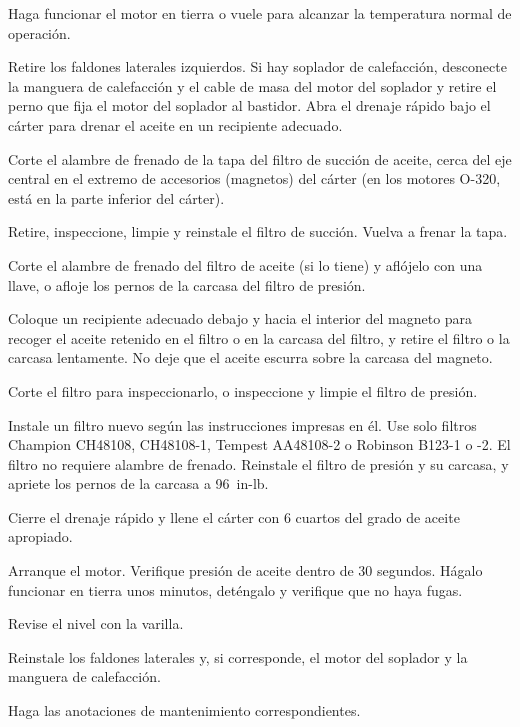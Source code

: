 \begin{pasos}
\item Haga funcionar el motor en tierra o vuele para alcanzar la temperatura normal de operación.
\item Retire los faldones laterales izquierdos. Si hay soplador de calefacción, desconecte la manguera de calefacción y el cable de masa del motor del soplador y retire el perno que fija el motor del soplador al bastidor. Abra el drenaje rápido bajo el cárter para drenar el aceite en un recipiente adecuado.
\item Corte el alambre de frenado de la tapa del filtro de succión de aceite, cerca del eje central en el extremo de accesorios (magnetos) del cárter (en los motores O-320, está en la parte inferior del cárter).
\item Retire, inspeccione, limpie y reinstale el filtro de succión. Vuelva a frenar la tapa.
\item Corte el alambre de frenado del filtro de aceite (si lo tiene) y aflójelo con una llave, o afloje los pernos de la carcasa del filtro de presión.
\item Coloque un recipiente adecuado debajo y hacia el interior del magneto para recoger el aceite retenido en el filtro o en la carcasa del filtro, y retire el filtro o la carcasa lentamente. No deje que el aceite escurra sobre la carcasa del magneto.
\item Corte el filtro para inspeccionarlo, o inspeccione y limpie el filtro de presión.
\item Instale un filtro nuevo según las instrucciones impresas en él. Use solo filtros Champion CH48108, CH48108-1, Tempest AA48108-2 o Robinson B123-1 o -2. El filtro no requiere alambre de frenado. Reinstale el filtro de presión y su carcasa, y apriete los pernos de la carcasa a 96~in-lb.
\item Cierre el drenaje rápido y llene el cárter con 6 cuartos del grado de aceite apropiado.
\item Arranque el motor. Verifique presión de aceite dentro de 30 segundos. Hágalo funcionar en tierra unos minutos, deténgalo y verifique que no haya fugas.
\item Revise el nivel con la varilla.
\item Reinstale los faldones laterales y, si corresponde, el motor del soplador y la manguera de calefacción.
\item Haga las anotaciones de mantenimiento correspondientes.
\end{pasos}

